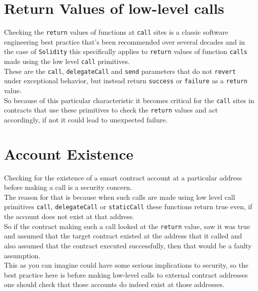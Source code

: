 \section{Return Values of low-level calls}

Checking the \texttt{return} values of functions at \texttt{call} sites is a classic software engineering best practice that's been recommended over several decades and in the case of \texttt{Solidity} this specifically applies to \texttt{return} values of function \texttt{calls} made using the low level \texttt{call} primitives.\\

These are the \texttt{call}, \texttt{delegateCall} and \texttt{send} parameters that do not \texttt{revert} under exceptional behavior, but instead return \texttt{success} or \texttt{failure} as a \texttt{return} value. \\

So because of this particular characteristic it becomes critical for the \texttt{call} sites in contracts that use these primitives to check the \texttt{return} values and act accordingly, if not it could lead to unexpected failure.

\section{Account Existence}

Checking for the existence of a smart contract account at a particular address before making a call is a security concern. \\

The reason for that is because when such calls are made using low level call primitives \texttt{call}, \texttt{delegateCall} or \texttt{staticCall} these functions return true even, if the account does not exist at that address.\\

So if the contract making such a call looked at the \texttt{return} value, saw it was true and assumed that the target contract existed at the address that it called and also assumed that the contract executed successfully, then that would be a faulty assumption.\\

This as you can imagine could have some serious implications to security, so the best practice here is before making low-level calls to external contract addresses one should check that those accounts do indeed exist at those addresses.

